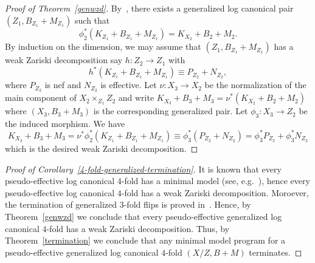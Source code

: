 \documentclass{amsart}
\theoremstyle{remark}
\numberwithin{equation}{section}
\begin{document}
\begin{proof}[Proof of Theorem~\ref{genwzd}]
By~\cite[Theorem 1.4]{Fil18}, there exists a generalized log canonical pair $(Z_1, B_{Z_1}+M_{Z_1})$ such that
\[
\phi_2^*(K_{Z_1}+B_{Z_1}+M_{Z_1})= K_{X_2}+B_2+M_2.
\]
By induction on the dimension, we may assume that $(Z_1,B_{Z_1}+M_{Z_1})$ has a weak Zariski decomposition	say $h\colon Z_2\rightarrow Z_1$
with
\[
h^*( K_{Z_1}+B_{Z_1}+M_{Z_1})  \equiv P_{Z_2}+N_{Z_2},
\]
where $P_{Z_2}$ is nef and $N_{Z_2}$ is effective. 
Let $\nu\colon X_3 \rightarrow X_2$ be the normalization of the main component of $X_2\times_{Z_1} Z_2$
and write $K_{X_3}+B_3+M_3=\nu^*(K_{X_2}+B_2+M_2)$ where $(X_3,B_3+M_3)$ is the corresponding generalized pair.
Let $\phi _3: X_3\to Z_2$ be the induced morphism.
We have 
\[
K_{X_3}+B_3+M_3 = \nu^*\phi_2^*( K_{Z_1}+B_{Z_1}+M_{Z_1}) \equiv \phi_3^*(P_{Z_2}+N_{Z_2}) = \phi_3^*P_{Z_2}+\phi_3^*N_{Z_2}
\]
which is the desired weak Zariski decomposition.
\end{proof}

\begin{proof}[Proof of Corollary~\ref{4-fold-generalized-termination}]
It is known that every pseudo-effective log canonical $4$-fold has a minimal model (see, e.g.~\cite{Shok09}),
hence every pseudo-effective log canonical $4$-fold has a weak Zariski decomposition.
Moroever, the termination of generalized $3$-fold flips is proved in~\cite[\S 4]{Mor18}.
Hence, by Theorem~\ref{genwzd} we conclude that every pseudo-effective generalized log canonical $4$-fold
has a weak Zariski decomposition.
Thus, by Theorem~\ref{termination} we conclude that any minimal model program for a pseudo-effective
generalized log canonical $4$-fold $(X/Z,B+M)$ terminates.
\end{proof}
\end{document}
